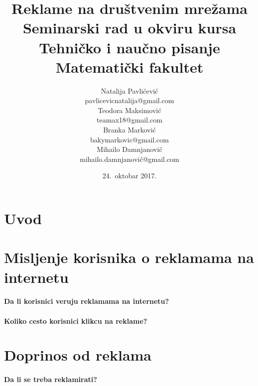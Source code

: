 \documentclass[a4paper]{article}
\title{Reklame na društvenim mrežama\\ \small{Seminarski rad u okviru kursa\\Tehničko i naučno pisanje\\ Matematički fakultet}}
\author{Natalija Pavlićević\\ pavlicevicnatalija@gmail.com\\ Teodora Maksimović\\ teamax18@gmail.com\\ Branka Marković\\ bakymarkovic@gmail.com\\ Mihailo Damnjanović\\ mihailo.damnjanović@gmail.com}
\date{24.~oktobar 2017.}
\begin{document}
	
\section{Uvod}
\label{sec:uvod}
\newpage
	\section{Misljenje korisnika o reklamama na internetu}
	\label{sec:misljenje}
	\paragraph{Da li korisnici veruju reklamama na internetu?}
	\paragraph{Koliko cesto korisnici klikcu na reklame?}
	\section{Doprinos od reklama}
	\label{sec:doprinos}
	\paragraph{Da li se treba reklamirati?}
	
\end{document}
